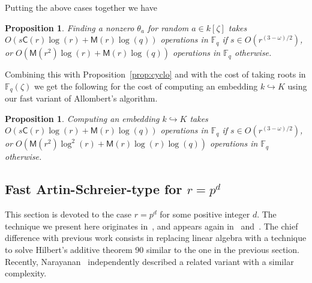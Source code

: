 \documentclass[12pt]{article}
\theoremstyle{plain}
\newtheorem{proposition}[theorem]{Proposition}
\theoremstyle{definition}
\def\F{\ensuremath{\mathbb{F}}}
\def\MM{\ensuremath{\mathsf{M}}}
\def\CC{\ensuremath{\mathsf{C}}}
\newcounter{algorithm}
\begin{document}
Putting the above cases together we have
\begin{proposition}
	\label{proposition:XiDelta-updated}
	Finding a nonzero $\theta_a$ for random $a \in k[\zeta]$ takes $O(s\CC(r)\log(r) + 
	\MM(r)\log(q))$ operations in $\F_q$ if $s \in O(r^{(3 - \omega) / 2})$, or $O(\MM(r^2)\log(r) 
	+ \MM(r)\log(q))$ operations in $\F_q$ otherwise.
\end{proposition}
Combining this with Proposition~\ref{prop:cyclo} and with the cost of taking roots in $\F_q(\zeta)$ we get the following for the cost of 
computing an embedding $k \hookrightarrow K$ using our fast variant of Allombert's algorithm.
\begin{proposition}
	\label{proposition:XiDelta-updated}
	Computing an embedding $k \hookrightarrow K$ takes $O(s\CC(r)\log(r) + \MM(r)\log(q))$ 
	operations in $\F_q$ if $s \in O(r^{(3 - \omega) / 2})$, or $O(\MM(r^2)\log^2(r) + 
	\MM(r)\log(r)\log(q))$ operations in $\F_q$ otherwise.
\end{proposition}



\subsection{Fast Artin-Schreier-type for $r=p^d$}
\label{sec:fast-artin-schreier}

This section is devoted to the case $r = p^d$ for some positive integer $d$.
The technique we present here originates in~\cite[Lemma 5]{Adleman-Lenstra},
and appears again in~\cite{LenstraJr91} and~\cite{Allombert02}.
The chief difference with previous work consists in replacing linear algebra
with a technique to solve Hilbert's additive theorem 90 similar to the one in
the previous section.
Recently, Narayanan~\cite[Sec.~4]{narayanan2016fast} independently described
a related variant with a similar complexity.
\end{document}
